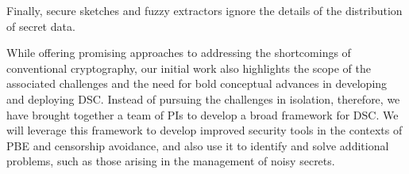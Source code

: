 {{Finally, secure
sketches and fuzzy extractors ignore the details of the distribution of secret
data. 


\fi

While offering promising approaches to addressing the shortcomings of
conventional cryptography, our initial work also highlights the scope of the associated
challenges and the need for bold conceptual advances in developing and
deploying DSC.  Instead of pursuing the challenges in isolation, therefore, we
have brought together a team of PIs to develop a broad framework for DSC. 
We will leverage this framework to develop improved security tools in the
contexts of PBE and censorship avoidance, and also use it to identify and solve
additional problems, such as those arising in the management of noisy
secrets.  

}}
